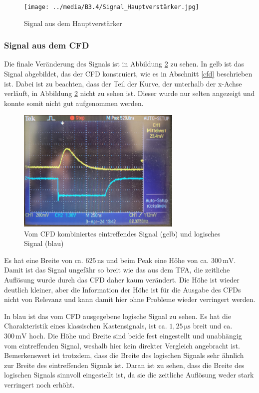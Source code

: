 \documentclass[12pt,a4paper]{scrartcl}
\numberwithin{equation}{section} %
\begin{document}
\begin{figure}[h]
	\centering
	\texttt{[image: ../media/B3.4/Signal\_Hauptverstärker.jpg]}
	\caption{Signal aus dem Hauptverstärker}
	\label{fig:signal_vv+hv}
\end{figure}

\subsubsection{Signal aus dem CFD}
Die finale Veränderung des Signals ist in Abbildung \ref{fig:signal_cfd} zu sehen. In gelb ist das Signal abgebildet, das der CFD konstruiert, wie es in Abschnitt \ref{cfd} beschrieben ist. Dabei ist zu beachten, dass der Teil der Kurve, der unterhalb der x-Achse verläuft, in Abbildung \ref{fig:signal_cfd} nicht zu sehen ist. Dieser wurde nur selten angezeigt und konnte somit nicht gut aufgenommen werden.

\begin{figure}[h]
	\centering
	\includegraphics[width=0.7\textwidth]{../media/B3.4/Signal_CFD.jpg}
	\caption{Vom CFD kombiniertes eintreffendes Signal (gelb) und logisches Signal (blau)}
	\label{fig:signal_cfd}
\end{figure}

Es hat eine Breite von ca. $625 \mathrm{\, ns}$ und beim Peak eine Höhe von ca. $300 \mathrm{\, mV}$. Damit ist das Signal ungefähr so breit wie das aus dem TFA, die zeitliche Auflösung wurde durch das CFD  daher kaum verändert. Die Höhe ist wieder deutlich kleiner, aber die Information der Höhe ist für die Ausgabe des CFDs nicht von Relevanz und kann damit hier ohne Probleme wieder verringert werden.

In blau ist das vom CFD ausgegebene logische Signal zu sehen. Es hat die Charakteristik eines klassischen Kastensignals, ist ca. $1,25 \mathrm{\, \mu s}$ breit und ca. $300 \mathrm{\, mV}$ hoch. Die Höhe und Breite sind beide fest eingestellt und unabhängig vom eintreffenden Signal, weshalb hier kein direkter Vergleich angebracht ist. Bemerkenswert ist trotzdem, dass die Breite des logischen Signals sehr ähnlich zur Breite des eintreffenden Signals ist. Daran ist zu sehen, dass die Breite des logischen Signals sinnvoll eingestellt ist, da sie die zeitliche Auflösung weder stark verringert noch erhöht.
\end{document}
